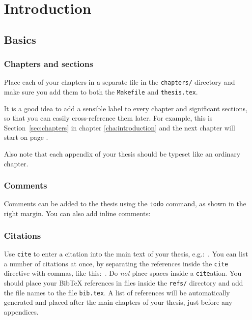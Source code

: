 \chapter{\label{cha:introduction}Introduction}


\section{Basics}

\subsection{\label{sec:chapters}Chapters and sections}

Place each of your chapters in a separate file in the \verb!chapters/!
directory and make sure you add them to both the \verb!Makefile! and
\verb!thesis.tex!.

It is a good idea to add a sensible label to every chapter and
significant sections, so that you can easily cross-reference them
later. For example, this is Section~\ref{sec:chapters} in chapter
\ref{cha:introduction} and the next chapter will start on page
\pageref{cha:example}.

Also note that each appendix of your thesis should be typeset like an
ordinary chapter.

\subsection{Comments}

Comments can be added to the thesis using the 
 \verb!todo! command, as shown in the 
right margin. You can also add inline comments:


\subsection{Citations}

Use \verb!cite! to enter a citation into the main text of your thesis,
e.g.:~\cite{Roscoe+97}. You can list a number of citations at once, by
separating the references inside the \verb!cite! directive with
commas, like this:~\cite{Geurts90,Martin96,Welch+99}. Do \emph{not}
place spaces inside a \verb!cite!ation. You should place your BibTeX
references in files inside the \verb!refs/! directory and add the file
names to the file \verb!bib.tex!. A list of references will be
automatically generated and placed after the main chapters of your
thesis, just before any appendices.


